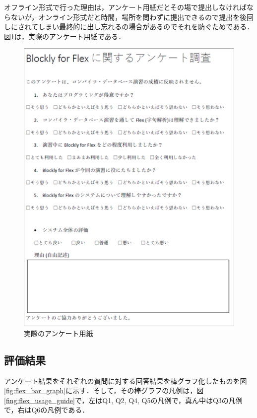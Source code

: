 \documentclass{risepaper}
\begin{document}
オフライン形式で行った理由は，アンケート用紙だとその場で提出しなければならないが，オンライン形式だと時間，場所を問わずに提出できるので提出を後回しにされてしまい最終的に出し忘れるの場合があるのでそれを防ぐためである．図\ref{fig:questionnaire}は，実際のアンケート用紙である．

\begin{figure}[h]
\begin{center}
\includegraphics[scale=1.0]{img/questionnaire.PNG}
\caption{実際のアンケート用紙}%
\label{fig:questionnaire}
\end{center}%
\end{figure}%


   		\subsection{評価結果}

アンケート結果をそれぞれの質問に対する回答結果を棒グラフ化したものを図\ref{fig:flex_bar_graph}に示す．そして，その棒グラフの凡例は，図\ref{fing:flex_usage_guide}で，左はQ1, Q2, Q4, Q5の凡例で，真ん中はQ3の凡例で，右はQ6の凡例である．
\end{document}
